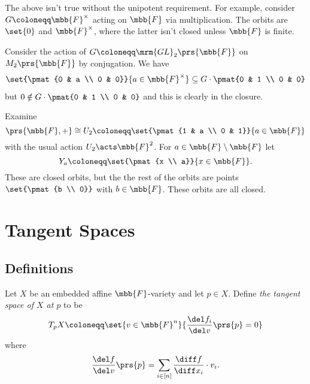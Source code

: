 \documentclass[10pt,a4paper,twoside,openany,hidelinks]{book}
\begin{document}
\begin{remark}
The above isn't true without the unipotent requirement.
For example, consider $G \coloneqq \mbb{F}^\times$ acting on $\mbb{F}$ via multiplication.
The orbits are $\set{0}$ and $\mbb{F}^\times$, where the latter isn't closed unless $\mbb{F}$ is finite.
\end{remark}

\begin{example}
Consider the action of $G \coloneqq \mrm{GL}_2\prs{\mbb{F}}$ on $M_2\prs{\mbb{F}}$ by conjugation. We have
\begin{align*}
\set{\pmat{0 & a \\ 0 & 0}}{a \in \mbb{F}^{\times}} \subseteq G \cdot \pmat{0 & 1 \\ 0 & 0}
\end{align*}
but $0 \notin G \cdot \pmat{0 & 1 \\ 0 & 0}$ and this is clearly in the closure.
\end{example}

\begin{example}
Examine
\[\prs{\mbb{F}, +} \cong U_2 \coloneqq \set{\pmat{1 & a \\ 0 & 1}}{a \in \mbb{F}}\]
with the usual action $U_2 \acts \mbb{F}^2$.
For $a \in \mbb{F} \setminus \mbb{F}$ let
\[Y_a \coloneqq \set{\pmat{x \\ a}}{x \in \mbb{F}} \text{.}\]
These are closed orbits, but the the rest of the orbits are points $\set{\pmat{b \\ 0}}$ with $b \in \mbb{F}$. These orbits are all closed.
\end{example}

\section{Tangent Spaces}

\subsection{Definitions}

\begin{definition}
Let $X$ be an embedded affine $\mbb{F}$-variety and let $p \in X$.
Define \emph{the tangent space of $X$ at $p$} to be
\begin{align*}
T_p X \coloneqq \set{v \in \mbb{F}^n}{\frac{\del f_i}{\del v} \prs{p} = 0}
\end{align*}
where
\[\frac{\del f}{\del v}\prs{p} = \sum_{i \in [n]} \frac{\diff f}{\diff x_i} \cdot v_i \text{.}\]
\end{definition}
\end{document}
